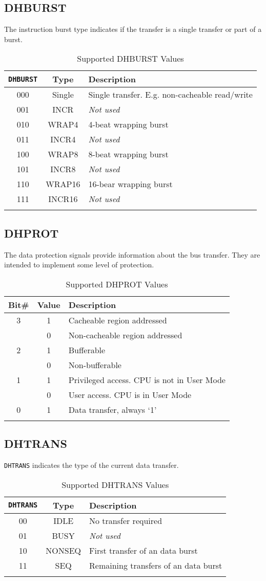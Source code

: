 \subsection{DHBURST}\label{dhburst}

The instruction burst type indicates if the transfer is a single
transfer or part of a burst.

\begin{longtable}[]{@{}ccl@{}}
\toprule
{\tt DHBURST} & Type & Description\tabularnewline
\midrule
\endhead
000 & Single & Single transfer. E.g. non-cacheable
read/write\tabularnewline
001 & INCR   & \emph{Not used}\tabularnewline
010 & WRAP4  & 4-beat wrapping burst\tabularnewline
011 & INCR4  & \emph{Not used}\tabularnewline
100 & WRAP8  & 8-beat wrapping burst\tabularnewline
101 & INCR8  & \emph{Not used}\tabularnewline
110 & WRAP16 & 16-bear wrapping burst\tabularnewline
111 & INCR16 & \emph{Not used}\tabularnewline
\bottomrule
\caption{Supported DHBURST Values}
\label{tab:dhburst-values}
\end{longtable}


\subsection{DHPROT}\label{dhprot}

The data protection signals provide information about the bus transfer.
They are intended to implement some level of protection.

\begin{longtable}[]{@{}ccl@{}}
\toprule
Bit\# & Value & Description\tabularnewline
\midrule
\endhead
3 & 1 & Cacheable region addressed\tabularnewline
  & 0 & Non-cacheable region addressed\tabularnewline
2 & 1 & Bufferable\tabularnewline
  & 0 & Non-bufferable\tabularnewline
1 & 1 & Privileged access. CPU is not in User Mode\tabularnewline
  & 0 & User access. CPU is in User Mode\tabularnewline
0 & 1 & Data transfer, always `1'\tabularnewline
\bottomrule
\caption{Supported DHPROT Values}
\label{tab:dhprot-values}
\end{longtable}

\subsection{DHTRANS}\label{dhtrans}

\texttt{DHTRANS} indicates the type of the current data transfer.

\begin{longtable}[]{@{}ccl@{}}
\toprule
{\tt DHTRANS} & Type & Description\tabularnewline
\midrule
\endhead
00 & IDLE   & No transfer required\tabularnewline
01 & BUSY   & \emph{Not used}\tabularnewline
10 & NONSEQ & First transfer of an data burst\tabularnewline
11 & SEQ    & Remaining transfers of an data burst\tabularnewline
\bottomrule
\caption{Supported DHTRANS Values}
\label{tab:dhtrans-values}
\end{longtable}

